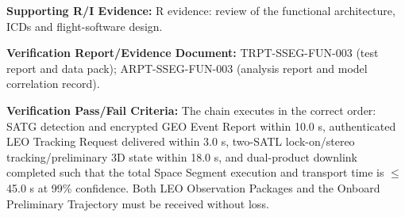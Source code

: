 \par\textbf{Supporting R/I Evidence:} R evidence: review of the functional architecture, ICDs and flight-software design.
\par\textbf{Verification Report/Evidence Document:} TRPT-SSEG-FUN-003 (test report and data pack); ARPT-SSEG-FUN-003 (analysis report and model correlation record).
\par\textbf{Verification Pass/Fail Criteria:} The chain executes in the correct order: SATG detection and encrypted GEO Event Report within 10.0 s, authenticated LEO Tracking Request delivered within 3.0 s, two-SATL lock-on/stereo tracking/preliminary 3D state within 18.0 s, and dual-product downlink completed such that the total Space Segment execution and transport time is $\le$45.0 s at 99\% confidence. Both LEO Observation Packages and the Onboard Preliminary Trajectory must be received without loss.
\par\medskip
